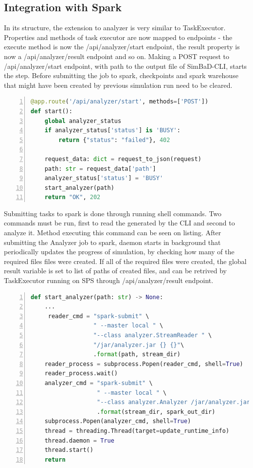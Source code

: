 \subsection{Integration with Spark}
In its structure, the extension to analyzer is very similar to TaskExecutor. Properties and methods of task executor are now mapped to endpoints - the execute method is now the /api/analyzer/start endpoint, the result property is now a /api/analyzer/result endpoint and so on. Making a POST request to /api/analyzer/start endpoint, with path to the output file of SimBaD-CLI, starts the step. Before submitting the job to spark, checkpoints and spark warehouse that might have been created by previous simulation run need to be cleared.
\begin{lstlisting}[label=list:sp-exec-local-use,caption=Use of LocalExecutor for SimBaD-CLI step, basicstyle=\footnotesize\ttfamily, language=python, numbers=left]
@app.route('/api/analyzer/start', methods=['POST'])
def start():
    global analyzer_status
    if analyzer_status['status'] is 'BUSY':
        return {"status": "failed"}, 402
        
    request_data: dict = request_to_json(request)
    path: str = request_data['path']
    analyzer_status['status'] = 'BUSY'
    start_analyzer(path)
    return "OK", 202
\end{lstlisting}
Submitting tasks to spark is done through running shell commands. Two commands must be run, first to read the generated by the CLI and second to analyze it. Method executing this command can be seen on listing. After submitting the Analyzer job to spark, daemon starts in background that periodically updates the progress of simulation, by checking how many of the required files files were created. If all of the required files were created, the global result variable is set to list of paths of created files, and can be retrived by TaskExecutor running on SPS through /api/analyzer/result endpoint.
\begin{lstlisting}[label=list:sp-exec-local-use,caption=Use of LocalExecutor for SimBaD-CLI step, basicstyle=\footnotesize\ttfamily, language=python, numbers=left]
def start_analyzer(path: str) -> None:
    ...
     reader_cmd = "spark-submit" \
                  " --master local " \
                  "--class analyzer.StreamReader " \
                  "/jar/analyzer.jar {} {}"\
                  .format(path, stream_dir)
    reader_process = subprocess.Popen(reader_cmd, shell=True)
    reader_process.wait()
    analyzer_cmd = "spark-submit" \
                   " --master local " \
                   "--class analyzer.Analyzer /jar/analyzer.jar {} {}"\
                   .format(stream_dir, spark_out_dir)
    subprocess.Popen(analyzer_cmd, shell=True)
    thread = threading.Thread(target=update_runtime_info)
    thread.daemon = True
    thread.start()
    return
\end{lstlisting}
